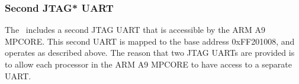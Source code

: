 \subsubsection{Second JTAG* UART}

The \systemName~includes a second JTAG UART that is accessible by the ARM A9 MPCORE.
This second UART is mapped to the base address {\sf 0xFF201008}, and operates as described
above. The reason that two JTAG UARTs are provided is to allow each processor in the ARM
A9 MPCORE to have access to a separate UART.

